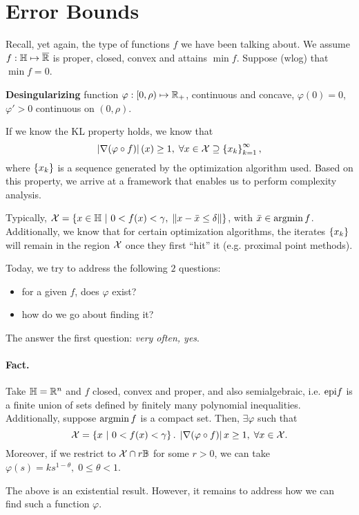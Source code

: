 \section{Error Bounds}
Recall, yet again, the type of functions $f$ we have been talking about. We
assume $f: \mathbb{H} \mapsto \overline{\mathbb{R}}$ is proper, closed, convex and attains
$\min f$. Suppose (wlog) that $\min f = 0$.

\textbf{Desingularizing} function $\varphi: [0, \rho) \mapsto \mathbb{R}_+$,
continuous and concave, $\varphi(0) = 0$, $\varphi' > 0$ continuous on $(0,
\rho)$.

If we know the KL property holds, we know that
\[
	\left| \nabla (\varphi \circ f) \right|(x) \geq 1, \;
	\forall x \in \mathcal{X} \supseteq \left\{ x_k \right\}_{k=1}^{\infty},
\]
where $\left\{ x_k \right\}$ is a sequence generated by the optimization algorithm used.
Based on this property, we arrive at a framework that enables us to perform
complexity analysis.

Typically, $\mathcal{X} = \left\{ x \in \mathbb{H} \ \middle| \  0 < f(x) < \gamma, \; \left \| x - \bar{x}
\leq \delta \right \| \right\}$, with $\bar{x} \in \operatorname*{argmin} f$. Additionally, we know that for
certain optimization algorithms, the iterates $\left\{ x_k \right\}$ will remain in the
region $\mathcal{X}$ once they first ``hit'' it (e.g. proximal point methods).

Today, we try to address the following $2$ questions:
\begin{itemize}
	\item for a given $f$, does $\varphi$ exist?
	\item how do we go about finding it?
\end{itemize}

The answer the first question: \textit{very often, yes}.

\paragraph{Fact.} Take $\mathbb{H} = \mathbb{R}^n$ and $f$ closed, convex and proper, and
also semialgebraic, i.e. $\mathrm{epi} f$ is a finite union of sets defined by finitely
many polynomial inequalities. Additionally, suppose $\operatorname*{argmin} f$ is a compact
set. Then, $\exists \varphi$ such that
\[
	\mathcal{X} = \left\{ x \ \middle| \  0 < f(x) < \gamma \right\}. \; \left| \nabla (\varphi \circ f) \right|{x}
	\geq 1, \; \forall x \in \mathcal{X}.
\]
Moreover, if we restrict to $\mathcal{X} \cap r \mathbb{B}$ for some $r > 0$, we can
take $\varphi(s) = k s^{1 - \theta}, \; 0 \leq \theta < 1$.

The above is an existential result. However, it remains to address how we can
find such a function $\varphi$.

